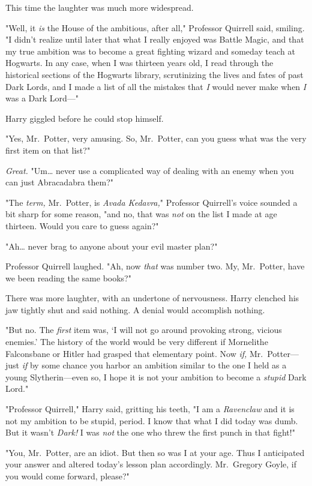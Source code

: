 This time the laughter was much more widespread.

"Well, it \emph{is} the House of the ambitious, after all," Professor Quirrell 
said, smiling. "I didn't realize until later that what I really enjoyed was 
Battle Magic, and that my true ambition was to become a great fighting wizard 
and someday teach at Hogwarts. In any case, when I was thirteen years old, I 
read through the historical sections of the Hogwarts library, scrutinizing the 
lives and fates of past Dark Lords, and I made a list of all the mistakes that 
\emph{I} would never make when \emph{I} was a Dark Lord---"

Harry giggled before he could stop himself.

"Yes, Mr.~Potter, very amusing. So, Mr.~Potter, can you guess what was the very 
first item on that list?"

\emph{Great.} "Um{\ldots} never use a complicated way of dealing with an enemy 
when you can just Abracadabra them?"

"The \emph{term,} Mr.~Potter, is \emph{Avada Kedavra,}" Professor Quirrell's 
voice sounded a bit sharp for some reason, "and no, that was \emph{not} on the 
list I made at age thirteen. Would you care to guess again?"

"Ah{\ldots} never brag to anyone about your evil master plan?"

Professor Quirrell laughed. "Ah, now \emph{that} was number two. My, 
Mr.~Potter, have we been reading the same books?"

There was more laughter, with an undertone of nervousness. Harry clenched his 
jaw tightly shut and said nothing. A denial would accomplish nothing.

"But no. The \emph{first} item was, `I will not go around provoking strong, 
vicious enemies.' The history of the world would be very different if 
Mornelithe Falconsbane or Hitler had grasped that elementary point. Now 
\emph{if,} Mr.~Potter---just \emph{if} by some chance you harbor an ambition 
similar to the one I held as a young Slytherin---even so, I hope it is not your 
ambition to become a \emph{stupid} Dark Lord."

"Professor Quirrell," Harry said, gritting his teeth, "I am a \emph{Ravenclaw} 
and it is not my ambition to be stupid, period. I know that what I did today 
was dumb. But it wasn't \emph{Dark!} I was \emph{not} the one who threw the 
first punch in that fight!"

"You, Mr.~Potter, are an idiot. But then so was I at your age. Thus I 
anticipated your answer and altered today's lesson plan accordingly. 
Mr.~Gregory Goyle, if you would come forward, please?"

